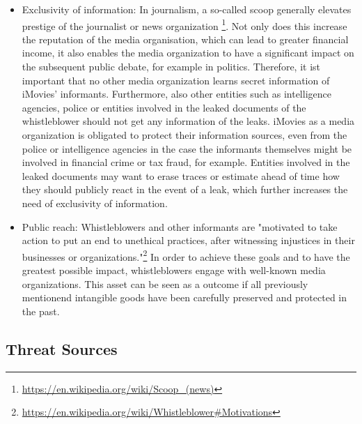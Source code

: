 \documentclass[english]{article}
\begin{document}
\begin{itemize}
    \item Exclusivity of information: In journalism, a so-called scoop generally elevates prestige of the journalist or news organization \footnote{\url{https://en.wikipedia.org/wiki/Scoop\_(news)}}. Not only does this increase the reputation of the media organisation, which can lead to greater financial income, it also enables the media organization to have a significant impact on the subsequent public debate, for example in politics. Therefore, it ist important that no other media organization learns secret information of iMovies' informants. Furthermore, also other entities such as intelligence agencies, police or entities involved in the leaked documents of the whistleblower should not get any information of the leaks. iMovies as a media organization is obligated to protect their information sources, even from the police or intelligence agencies in the case the informants themselves might be involved in financial crime or tax fraud, for example. Entities involved in the leaked documents may want to erase traces or estimate ahead of time how they should publicly react in the event of a leak, which further increases the need of exclusivity of information.
  \item Public reach: Whistleblowers and other informants are "motivated to take action to put an end to unethical practices, after witnessing injustices in their businesses or organizations."\footnote{\url{https://en.wikipedia.org/wiki/Whistleblower\#Motivations}} In order to achieve these goals and to have the greatest possible impact, whistleblowers engage with well-known media organizations. This asset can be seen as a outcome if all previously mentionend intangible goods have been carefully preserved and protected in the past.
  \end{itemize}
\subsection{Threat Sources}
\end{document}
